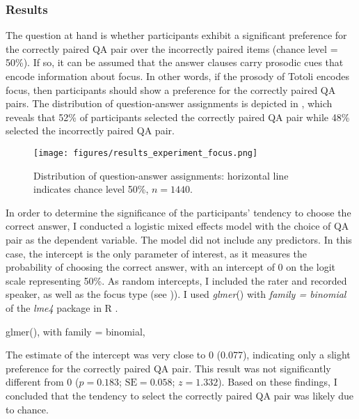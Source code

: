 \subsubsection{Results}
\label{sec:results}



The question at hand is whether participants exhibit a significant preference for the correctly paired QA pair over the incorrectly paired items (chance level = 50\%). If so, it can be assumed that the answer clauses carry prosodic cues that encode information about focus. In other words, if the prosody of Totoli encodes focus, then participants should show a preference for the correctly paired QA pairs. The distribution of question-answer assignments is depicted in , which reveals that 52\% of participants selected the correctly paired QA pair while 48\% selected the incorrectly paired QA pair.


\begin{figure}
	\texttt{[image: figures/results\_experiment\_focus.png]}
	\caption{Distribution of question-answer assignments: horizontal line indicates chance level 50\%, $n = 1440$.}
	\label{results_experiment_focus}
\end{figure}




In order to determine the significance of the participants' tendency to choose the correct answer, I conducted a logistic mixed effects model   with the choice of QA pair as the dependent variable. The model did not include any predictors. In this case, the intercept is the only parameter of interest, as it measures the probability of choosing the correct answer, with an intercept of 0 on the logit scale representing 50\%. As random intercepts, I included the rater and recorded speaker, as well as the focus type (see )). I used  \textit{glmer}()  with \textit{family = binomial} of the \textit{lme4}  package \citep{lme4} in R  \citep{R_manual}.

glmer(), with family = binomial,

The estimate of the intercept was very close to 0 (0.077), indicating only a slight preference for the correctly paired QA pair. This result was not significantly different from 0 ($p = 0.183$; $\text{SE} = 0.058$; $z = 1.332$). Based on these findings, I concluded that the tendency to select the correctly paired QA pair was likely due to chance.




